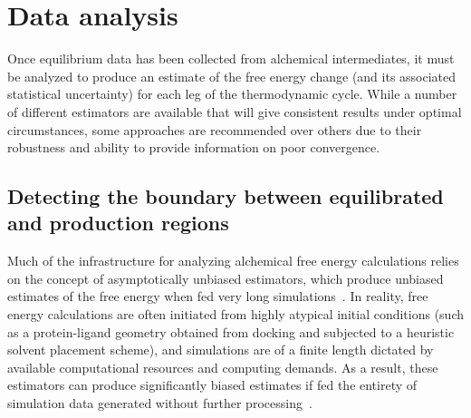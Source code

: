 \documentclass[9pt,bestpractices]{livecoms}
\begin{document}
\section{Data analysis}
\label{sec:data_analysis}
Once equilibrium data has been collected from alchemical intermediates, it must be analyzed to produce an estimate of the free energy change (and its associated statistical uncertainty) for each leg of the thermodynamic cycle.
While a number of different estimators are available that will give consistent results under optimal circumstances, some approaches are recommended over others due to their robustness and ability to provide information on poor convergence.

\subsection{Detecting the boundary between equilibrated and production regions}
\label{sec:automatic-equilibration-detection}
Much of the infrastructure for analyzing alchemical free energy calculations relies on the concept of asymptotically unbiased estimators, which produce unbiased estimates of the free energy when fed very long simulations~\cite{shirts2005comparison}.
In reality, free energy calculations are often initiated from highly atypical initial conditions (such as a protein-ligand geometry obtained from docking and subjected to a heuristic solvent placement scheme), and simulations are of a finite length dictated by available computational resources and computing demands.
As a result, these estimators can produce significantly biased estimates if fed the entirety of simulation data generated without further processing~\cite{chodera2016simple}.
\end{document}
